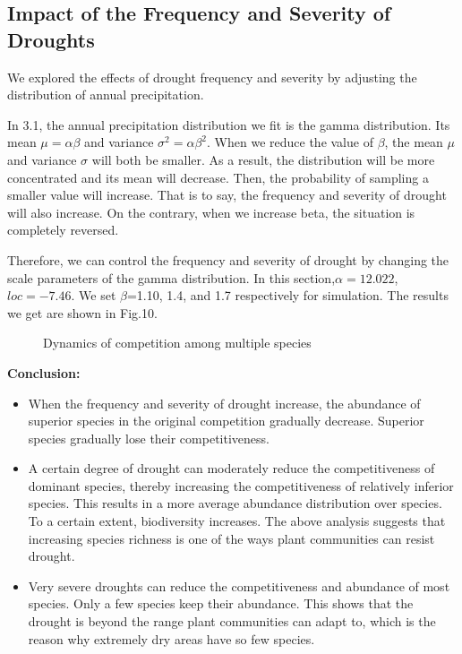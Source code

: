 \documentclass{mcmthesis}
\begin{document}
\subsection{Impact of the Frequency and Severity of Droughts}

We explored the effects of drought frequency and severity by adjusting the distribution of annual precipitation.

In 3.1, the annual precipitation distribution we fit is the gamma distribution. Its mean $\mu=\alpha\beta$ and variance $\sigma^2=\alpha\beta^2$. When we reduce the value of $\beta$, the mean $\mu$ and variance $\sigma$ will both be smaller. As a result, the distribution will be more concentrated and its mean will decrease. Then, the probability of sampling a smaller value will increase. That is to say, the frequency and severity of drought will also increase. On the contrary, when we increase beta, the situation is completely reversed.

Therefore, we can control the frequency and severity of drought by changing the scale parameters of the gamma distribution. In this section,$\alpha=12.022$, $loc=-7.46$. We set $\beta$=1.10, 1.4, and 1.7 respectively for simulation. The results we get are shown in Fig.10.

\begin{figure}[h]
	\centering
	\caption{Dynamics of competition among multiple species} 
\end{figure}

\textbf{Conclusion:}
\begin{itemize}
	\item When the frequency and severity of drought increase, the abundance of superior species in the original competition gradually decrease. Superior species gradually lose their competitiveness.
	
	\item A certain degree of drought can moderately reduce the competitiveness of dominant species, thereby increasing the competitiveness of relatively inferior species. This results in a more average abundance distribution over species. To a certain extent, biodiversity increases. The above analysis suggests that increasing species richness is one of the ways plant communities can resist drought.
	
	\item Very severe droughts can reduce the competitiveness and abundance of most species. 	Only a few species keep their abundance. This shows that the drought is beyond the range 	plant communities can adapt to, which is the reason why extremely dry areas have so few species.


	
\end{itemize}
\end{document}
